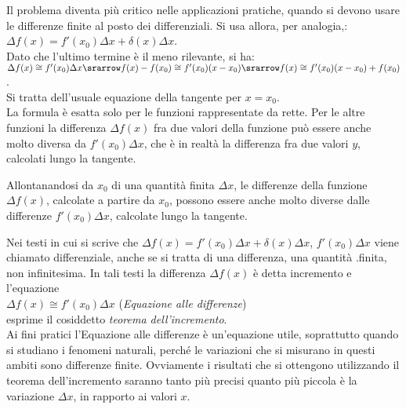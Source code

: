 Il problema diventa più critico nelle applicazioni pratiche, quando si 
devono 
usare le differenze finite al posto dei differenziali. Si usa allora, per
analogia,:\\
$\Delta f(x)=f'(x_0)\Delta x + \delta(x)\Delta x$.\\
Dato che l'ultimo termine è il meno rilevante, si ha:\\
$\Delta f(x)\cong f'(x_0)\Delta x \srarrow
f(x)-f(x_0)\cong f'(x_0)(x-x_0)\srarrow f(x)\cong f'(x_0)(x-x_0)+ f(x_0)$.\\
Si tratta dell'usuale equazione della tangente per $x=x_0$.\\
La formula è esatta solo per le funzioni rappresentate da rette.
Per le altre funzioni la differenza $\Delta f(x)$ fra due valori della 
funzione 
può essere anche molto diversa da $f'(x_0)\Delta x$, che è in realtà la 
differenza fra due valori $y$, calcolati lungo la tangente.

\begin{inaccessibleblock}
  \begin{minipage}[]{.4\textwidth}
    \begin{center} \falsodifferenziale \end{center}
 \end{minipage} 
  \hfill
 \begin{minipage}[]{.55\textwidth}
 Allontanandosi da $x_0$ di una quantità finita $\Delta x$, le differenze 
della
 funzione $\Delta f(x)$, calcolate a partire da $x_0$, possono 
 essere anche molto diverse dalle differenze $f'(x_0)\Delta x$, calcolate 
lungo
 la tangente.
 \end{minipage}
\end{inaccessibleblock}
\label{}

Nei testi in cui si scrive che $\Delta f(x)=f'(x_0)\Delta x+\delta(x)\Delta 
x$,
$f'(x_0)\Delta x$ viene chiamato differenziale, anche se si tratta di una 
differenza,
una quantità .finita, non infinitesima. In tali testi la differenza $\Delta 
f(x)$ è detta 
incremento e l'equazione\\
$\Delta f(x)\cong f'(x_0)\Delta x$ \hspace{.5cm}(\emph{Equazione alle 
differenze})\\ 
esprime il cosiddetto \emph{teorema dell'incremento}.\\
Ai fini pratici l'Equazione alle differenze è un'equazione utile, 
soprattutto 
quando si studiano i fenomeni naturali, perché le variazioni che si 
misurano in
questi ambiti sono differenze finite. 
Ovviamente i risultati che si ottengono utilizzando il teorema 
dell'incremento
saranno tanto più precisi quanto più piccola è la variazione $\Delta x$, in 
rapporto ai valori $x$.

